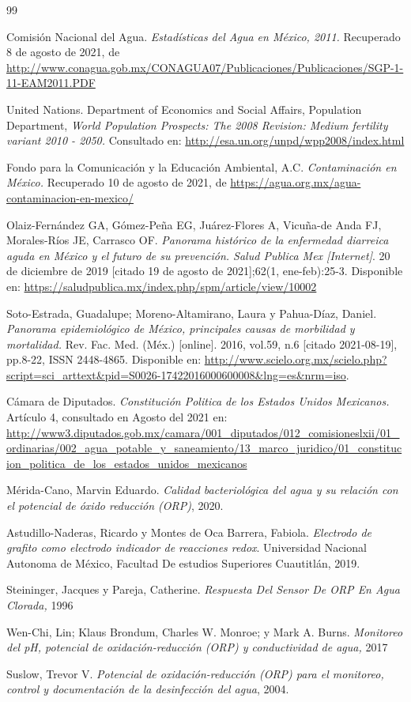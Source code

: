 \documentclass{article}
\begin{document}
\clearpage
\begin{thebibliography}{99}

Comisión Nacional del Agua.
\textit{Estadísticas del Agua en México, 2011.} Recuperado 8 de agosto de 2021, de \url{http://www.conagua.gob.mx/CONAGUA07/Publicaciones/Publicaciones/SGP-1-11-EAM2011.PDF}

United Nations. Department of Economics and Social Affairs, Population Department,
\textit{World Population Prospects: The 2008 Revision: Medium fertility variant 2010 - 2050.}
Consultado en: \url{http://esa.un.org/unpd/wpp2008/index.html} 

Fondo para la Comunicación y la Educación Ambiental, A.C.
\textit{Contaminación en México.} Recuperado 10 de agosto de 2021, de \url{https://agua.org.mx/agua-contaminacion-en-mexico/}

Olaiz-Fernández GA, Gómez-Peña EG, Juárez-Flores A, Vicuña-de Anda FJ, Morales-Ríos JE, Carrasco OF. \textit{Panorama histórico de la enfermedad diarreica aguda en México y el futuro de su prevención. Salud Publica Mex [Internet]}. 20 de diciembre de 2019 [citado 19 de agosto de 2021];62(1, ene-feb):25-3. Disponible en: \url{https://saludpublica.mx/index.php/spm/article/view/10002}

Soto-Estrada, Guadalupe; Moreno-Altamirano, Laura  y  Pahua-D\'iaz, Daniel. \textit{Panorama epidemiológico de México, principales causas de morbilidad y mortalidad.} Rev. Fac. Med. (Méx.) [online]. 2016, vol.59, n.6 [citado  2021-08-19], pp.8-22, ISSN 2448-4865. Disponible en: \url{http://www.scielo.org.mx/scielo.php?script=sci_arttext&pid=S0026-17422016000600008&lng=es&nrm=iso}. 

Cámara de Diputados. \textit{Constitución Politica de los Estados Unidos Mexicanos.} Artículo 4, consultado en Agosto del 2021 en:  
\url{http://www3.diputados.gob.mx/camara/001_diputados/012_comisioneslxii/01_ordinarias/002_agua_potable_y_saneamiento/13_marco_juridico/01_constitucion_politica_de_los_estados_unidos_mexicanos}

Mérida-Cano, Marvin Eduardo.
\textit{Calidad bacteriológica del agua y su relación con el potencial de óxido reducción (ORP)}, 2020.

Astudillo-Naderas, Ricardo y Montes de Oca Barrera, Fabiola. \textit{Electrodo de grafito como electrodo indicador de reacciones redox}.  Universidad Nacional Autonoma de México, Facultad De estudios Superiores Cuautitlán, 2019.

Steininger, Jacques y Pareja, Catherine. 
\textit{Respuesta Del Sensor De ORP En Agua Clorada,} 1996

Wen-Chi, Lin; Klaus Brondum, Charles W. Monroe; y Mark A. Burns. \textit{Monitoreo del pH, potencial de oxidación-reducción (ORP) y conductividad de agua,}  2017

Suslow, Trevor V. \textit{Potencial de oxidación-reducción (ORP) para el monitoreo, control y documentación de la desinfección del agua}, 2004.
\end{thebibliography}
\end{document}
